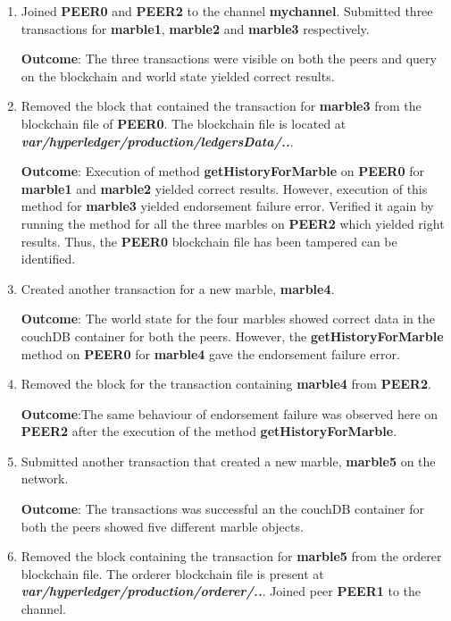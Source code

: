 \documentclass[
  a4paper,  %
  twoside,  %
  bibliography=totoc,
  headsepline,
  cleardoublepage=empty,
  parskip=half,
  draft=false
]{scrbook}
\begin{document}
\begin{enumerate}
    \item Joined \textbf{PEER0} and \textbf{PEER2} to the channel \textbf{mychannel}. Submitted three transactions for \textbf{marble1}, \textbf{marble2} and \textbf{marble3} respectively.
    
    \textbf{Outcome}: The three transactions were visible on both the peers and query on the blockchain and world state yielded correct results.
    \item Removed the block that contained the transaction for \textbf{marble3} from the blockchain file of \textbf{PEER0}. The blockchain file is located at {\ttfamily\bfseries\slshape var/hyperledger/production/ledgersData/..}.
    
    \textbf{Outcome}: Execution of method \textbf{getHistoryForMarble} on \textbf{PEER0} for \textbf{marble1} and \textbf{marble2} yielded correct results. However, execution of this method for \textbf{marble3} yielded endorsement failure error. Verified it again by running the method for all the three marbles on \textbf{PEER2} which yielded right results. Thus, the \textbf{PEER0} blockchain file has been tampered can be identified.
    \item Created another transaction for a new marble, \textbf{marble4}.
    
    \textbf{Outcome}: The world state for the four marbles showed correct data in the couchDB container for both the peers. However, the \textbf{getHistoryForMarble} method on \textbf{PEER0} for \textbf{marble4} gave the endorsement failure error.
    \item Removed the block for the transaction containing \textbf{marble4} from \textbf{PEER2}.
    
    \textbf{Outcome}:The same behaviour of endorsement failure was observed here on \textbf{PEER2} after the execution of the method \textbf{getHistoryForMarble}.
    \item Submitted another transaction that created a new marble, \textbf{marble5} on the network.
    
    \textbf{Outcome}: The transactions was successful an the couchDB container for both the peers showed five different marble objects.
    \item Removed the block containing the transaction for \textbf{marble5} from the orderer blockchain file. The orderer blockchain file is present at {\ttfamily\bfseries\slshape var/hyperledger/production/orderer/..}. Joined peer \textbf{PEER1} to the channel.
    

\end{enumerate}
\end{document}
